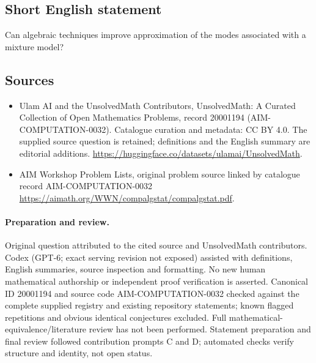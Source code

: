 \documentclass[11pt]{article}
\begin{document}
\subsection{Short English statement}
Can algebraic techniques improve approximation of the modes associated with a mixture model?
\subsection{Sources}
\begin{itemize}
\item[\hypertarget{source:20001194:1}{S1}] Ulam AI and the UnsolvedMath Contributors, UnsolvedMath: A Curated Collection of Open Mathematics Problems, record 20001194 (AIM-COMPUTATION-0032). Catalogue curation and metadata: CC BY 4.0. The supplied source question is retained; definitions and the English summary are editorial additions.
\url{https://huggingface.co/datasets/ulamai/UnsolvedMath}.
\item[\hypertarget{source:20001194:2}{S2}] AIM Workshop Problem Lists, original problem source linked by catalogue record AIM-COMPUTATION-0032
\url{https://aimath.org/WWN/compalgstat/compalgstat.pdf}.
\end{itemize}
\paragraph{Preparation and review.}
Original question attributed to the cited source and UnsolvedMath contributors. Codex (GPT-6; exact serving revision not exposed) assisted with definitions, English summaries, source inspection and formatting. No new human mathematical authorship or independent proof verification is asserted. Canonical ID 20001194 and source code AIM-COMPUTATION-0032 checked against the complete supplied registry and existing repository statements; known flagged repetitions and obvious identical conjectures excluded. Full mathematical-equivalence/literature review has not been performed. Statement preparation and final review followed contribution prompts C and D; automated checks verify structure and identity, not open status.
\label{end:20001194}
\end{document}
